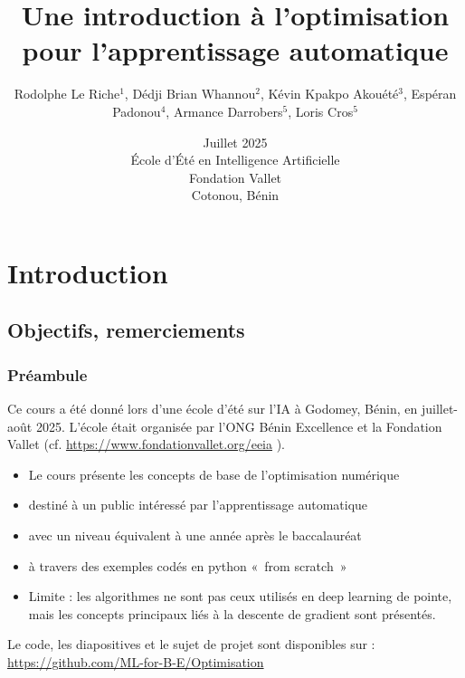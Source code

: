 \documentclass[12pt]{beamer}
\begin{document}
\title
[~Optimisation pour l'apprentissage automatique]
{Une introduction à l'optimisation pour l'apprentissage automatique}
\author
[Le Riche et al.]
{\normalsize Rodolphe Le Riche$^1$, Dédji Brian Whannou$^2$, Kévin Kpakpo Akouété$^3$, Espéran Padonou$^4$, Armance Darrobers$^5$, Loris Cros$^5$} 
\date[Juillet 2025]{Juillet 2025 \\
École d'Été en Intelligence Artificielle \\
Fondation Vallet \\
Cotonou, Bénin} 
\begin{frame}
\titlepage
\end{frame}

\section{Introduction}
\subsection{Objectifs, remerciements}

\begin{frame}
\frametitle{Préambule}
Ce cours a été donné lors d'une école d'été sur l'IA à Godomey, Bénin, en juillet-août 2025.  
L'école était organisée par l'ONG Bénin Excellence et la Fondation Vallet (cf. 
{\scriptsize
\url{https://www.fondationvallet.org/eeia}}
).
\begin{itemize}
\item Le cours présente les concepts de base de l'optimisation numérique
\item destiné à un public intéressé par l'apprentissage automatique
\item avec un niveau équivalent à une année après le baccalauréat
\item à travers des exemples codés en python « from scratch »
\item Limite : les algorithmes ne sont pas ceux utilisés en deep learning de pointe, mais les concepts principaux liés à la descente de gradient sont présentés.
\end{itemize}
Le code, les diapositives et le sujet de projet sont disponibles sur : {\scriptsize \url{https://github.com/ML-for-B-E/Optimisation}}
\end{frame}
\end{document}
